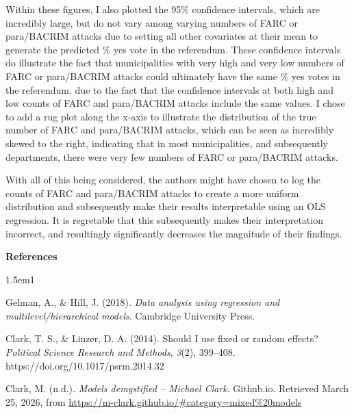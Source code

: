 \documentclass[12pt,letterpaper]{article}
\begin{document}
	Within these figures, I also plotted the 95\% confidence intervals, which are incredibly large, but do not vary among varying numbers of FARC or para/BACRIM attacks due to setting all other covariates at their mean to generate the predicted \% yes vote in the referendum. These confidence intervals do illustrate the fact that municipalities with very high and very low numbers of FARC or para/BACRIM attacks could ultimately have the same \% yes votes in the referendum, due to the fact that the confidence intervals at both high and low counts of FARC and para/BACRIM attacks include the same values. I chose to add a rug plot along the x-axis to illustrate the distribution of the true number of FARC and para/BACRIM attacks, which can be seen as incredibly skewed to the right, indicating that in most municipalities, and subsequently departments, there were very few numbers of FARC or para/BACRIM attacks. 
	
	With all of this being considered, the authors might have chosen to log the counts of FARC and para/BACRIM attacks to create a more uniform distribution and subsequently make their results interpretable using an OLS regression. It is regretable that this subsequently makes their interpretation incorrect, and resultingly significantly decreases the magnitude of their findings. 
	
	\newpage
	
	\begin{center}
		\textbf{References}
	\end{center}

	\begin{hangparas}{1.5em}{1} 
		
		Gelman, A., \& Hill, J. (2018). \textit{Data analysis using regression and 
		multilevel/hierarchical models}. Cambridge University Press.
	
		\medskip
	
		Clark, T. S., \& Linzer, D. A. (2014). Should I use fixed or random effects? 
		\textit{Political Science Research and Methods}, \textit{3}(2), 399--408. 
		https://doi.org/10.1017/psrm.2014.32
	
		\medskip
	
		Clark, M. (n.d.). \textit{Models demystified -- Michael Clark}. Github.io. 
		Retrieved March 25, 2026, from 
		\url{https://m-clark.github.io/#category=mixed%20models}
	
	\end{hangparas}
	
	
\end{document}
